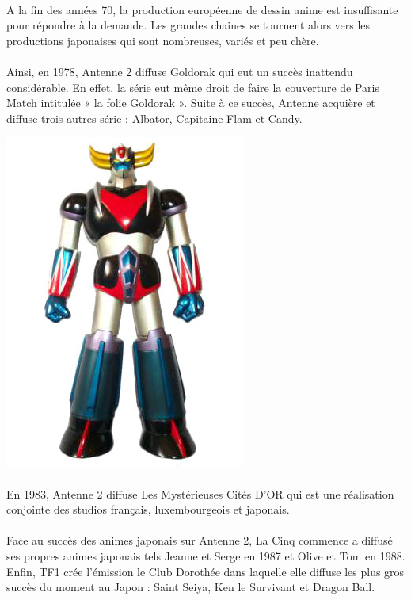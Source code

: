 \paragraph{}
A la fin des années 70, la production européenne de dessin anime est insuffisante pour répondre à la demande. Les grandes chaines se tournent alors vers les productions japonaises qui sont nombreuses, variés et peu chère. 
\paragraph{}
Ainsi, en 1978, Antenne 2 diffuse Goldorak qui eut un succès inattendu considérable. En effet, la série eut même droit de faire la couverture de Paris Match intitulée « la folie Goldorak ».  Suite à ce succès, Antenne acquière et diffuse trois autres série : Albator, Capitaine Flam et Candy.
\begin{center}
\includegraphics[scale=0.4]{goldorak.jpg}
\end{center}
\paragraph{}
En 1983, Antenne 2 diffuse Les Mystérieuses Cités D’OR qui est une réalisation conjointe des studios français, luxembourgeois et japonais. 
\paragraph{}
Face au succès des animes japonais sur Antenne 2, La Cinq commence a diffusé ses propres animes japonais tels Jeanne et Serge en 1987 et Olive et Tom en 1988. Enfin, TF1 crée l’émission le Club Dorothée dans laquelle elle diffuse les plus gros succès du moment au Japon : Saint Seiya, Ken le Survivant et Dragon Ball. 


